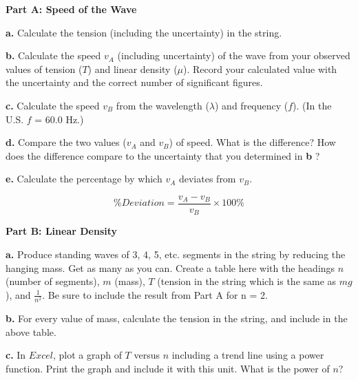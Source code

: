 \textbf{Part A: Speed of the Wave }

\textbf{a. } Calculate the tension (including the uncertainty) in the string.

\vspace{3cm}

\newpage

\textbf{b. } Calculate the speed $v_A$ (including uncertainty) of the wave from your observed values of tension
($T$) and linear density ($\mu $). Record your calculated value with the uncertainty and the correct number of significant
figures.


\vspace{4cm}

\textbf{c. } Calculate the speed $v_B$ from the wavelength ($\lambda $) and frequency ($f$). (In the U.S. $f$ = 60.0 Hz.)

\vspace{4cm}

\textbf{d. } Compare the two values ($v_A$ and $v_B$) of speed. What is the difference? How does the difference compare
to the uncertainty that you determined in \textbf{b }?

\vspace{4cm}

\textbf{e. } Calculate the percentage by which $v_A$ deviates from $v_B$.

\begin{equation}
\% Deviation =\frac {v_A - v_B}{v_B} \times 100\%
\end{equation}

\vspace{3cm}

\newpage

\textbf{Part B: Linear Density}

\textbf{a. } Produce standing waves of 3, 4, 5, etc. segments in the string by reducing the hanging mass. Get as many as you can. Create a table
here with the headings $n$ (number of segments), $m$ (mass), $T$ (tension in the string which is the same as $mg$), and $\frac{1}{n^2}$. Be sure to
include the result from Part A for n = 2.

\vspace{6cm}

\textbf{b. } For every value of mass, calculate the tension in the string, and include in the above table.

\textbf{c. } In $Excel$, plot a graph of $T$ versus $n$ including a trend line 
using a power function. Print the graph and include it with this unit. What is 
the power of $n$?
\vspace{20mm}

